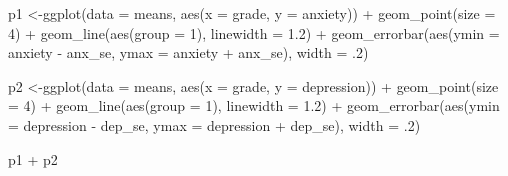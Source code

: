 \documentclass[
  letterpaper,
  10pt,
  krantz2]{krantz}
\makeatletter
\newenvironment{Shaded}{\begin{snugshade}}{\end{snugshade}}
\newcommand{\AttributeTok}[1]{\textcolor[rgb]{0.40,0.45,0.13}{#1}}
\newcommand{\DecValTok}[1]{\textcolor[rgb]{0.68,0.00,0.00}{#1}}
\newcommand{\FloatTok}[1]{\textcolor[rgb]{0.68,0.00,0.00}{#1}}
\newcommand{\FunctionTok}[1]{\textcolor[rgb]{0.28,0.35,0.67}{#1}}
\newcommand{\NormalTok}[1]{\textcolor[rgb]{0.00,0.23,0.31}{#1}}
\newcommand{\OtherTok}[1]{\textcolor[rgb]{0.00,0.23,0.31}{#1}}
\newcommand{\SpecialCharTok}[1]{\textcolor[rgb]{0.37,0.37,0.37}{#1}}
\newenvironment{kframe}{%
  \medskip{}
  \setlength{\fboxsep}{.8em}
  \def\at@end@of@kframe{}%
  \ifinner\ifhmode%
  \def\at@end@of@kframe{\end{minipage}}%
  \begin{minipage}{\columnwidth}%
  \fi\fi%
  \def\FrameCommand##1{\hskip\@totalleftmargin \hskip-\fboxsep
  \colorbox{shadecolor}{##1}\hskip-\fboxsep
      \hskip-\linewidth \hskip-\@totalleftmargin \hskip\columnwidth}%
  \MakeFramed {\advance\hsize-\width
    \@totalleftmargin\z@ \linewidth\hsize
    \@setminipage}}%
{\par\unskip\endMakeFramed%
  \at@end@of@kframe}
\renewenvironment{Shaded}{\begin{kframe}}{\end{kframe}}
\makeatother
\begin{document}
\begin{Shaded}
\begin{Highlighting}[]
\NormalTok{p1 }\OtherTok{\textless{}{-}}\FunctionTok{ggplot}\NormalTok{(}\AttributeTok{data =}\NormalTok{ means, }\FunctionTok{aes}\NormalTok{(}\AttributeTok{x =}\NormalTok{ grade, }\AttributeTok{y =}\NormalTok{ anxiety)) }\SpecialCharTok{+}
  \FunctionTok{geom\_point}\NormalTok{(}\AttributeTok{size =} \DecValTok{4}\NormalTok{) }\SpecialCharTok{+}
  \FunctionTok{geom\_line}\NormalTok{(}\FunctionTok{aes}\NormalTok{(}\AttributeTok{group =} \DecValTok{1}\NormalTok{), }\AttributeTok{linewidth =} \FloatTok{1.2}\NormalTok{) }\SpecialCharTok{+}
  \FunctionTok{geom\_errorbar}\NormalTok{(}\FunctionTok{aes}\NormalTok{(}\AttributeTok{ymin =}\NormalTok{ anxiety }\SpecialCharTok{{-}}\NormalTok{ anx\_se, }
                   \AttributeTok{ymax =}\NormalTok{ anxiety }\SpecialCharTok{+}\NormalTok{ anx\_se),}
                \AttributeTok{width =}\NormalTok{ .}\DecValTok{2}\NormalTok{) }

\NormalTok{p2 }\OtherTok{\textless{}{-}}\FunctionTok{ggplot}\NormalTok{(}\AttributeTok{data =}\NormalTok{ means, }\FunctionTok{aes}\NormalTok{(}\AttributeTok{x =}\NormalTok{ grade, }\AttributeTok{y =}\NormalTok{ depression)) }\SpecialCharTok{+}
  \FunctionTok{geom\_point}\NormalTok{(}\AttributeTok{size =} \DecValTok{4}\NormalTok{) }\SpecialCharTok{+}
  \FunctionTok{geom\_line}\NormalTok{(}\FunctionTok{aes}\NormalTok{(}\AttributeTok{group =} \DecValTok{1}\NormalTok{), }\AttributeTok{linewidth =} \FloatTok{1.2}\NormalTok{) }\SpecialCharTok{+}
  \FunctionTok{geom\_errorbar}\NormalTok{(}\FunctionTok{aes}\NormalTok{(}\AttributeTok{ymin =}\NormalTok{ depression }\SpecialCharTok{{-}}\NormalTok{ dep\_se, }
                    \AttributeTok{ymax =}\NormalTok{ depression }\SpecialCharTok{+}\NormalTok{ dep\_se),}
                \AttributeTok{width =}\NormalTok{ .}\DecValTok{2}\NormalTok{) }

\NormalTok{p1 }\SpecialCharTok{+}\NormalTok{ p2}
\end{Highlighting}
\end{Shaded}
\end{document}

